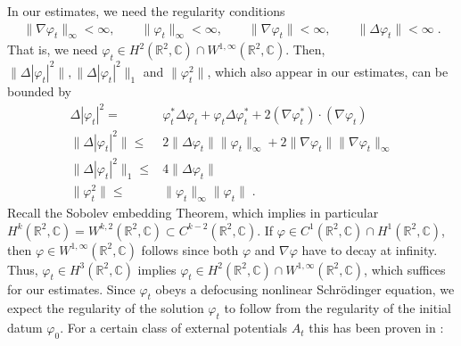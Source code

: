 \documentclass[11pt, english, american]{article}
\renewcommand{\phi}{\varphi}
\begin{document}
In our estimates, we need the regularity conditions 
\begin{align*}
\| \nabla \phi_t \|_\infty < \infty,
\qquad
\|  \phi_t \|_\infty < \infty,
\qquad
\| \nabla \phi_t \| < \infty,
\qquad
\| \Delta\phi_t \| < \infty \;.
\end{align*}
That is, we need $\phi_t \in H^2(\mathbb{R}^2,\mathbb{C}) \cap W^{1,\infty}(\mathbb{R}^2,\mathbb{C})$.
Then, $ \| \Delta|\phi_t| ^2 \|, \| \Delta|\phi_t| ^2 \|_1$ and $ \| \phi_t^ 2 \| $, which also appear in our estimates, can be bounded by
\begin{align*}
 \Delta|\phi_t|^ 2
 =&
 \phi^*_t \Delta \phi_t
  +
 \phi_t  \Delta\phi^*_t
   +
  2   (\nabla \phi^*_t) \cdot (\nabla \phi_t)
  \\
 \| \Delta|\phi_t| ^2 \|
 \leq &
2
 \| \Delta \phi_t \| \| \phi_t \| _\infty
 +
 2
 \| \nabla \phi_t \|  \| \nabla \phi_t \| _\infty
   \\
 \| \Delta|\phi_t| ^2 \|_1 \leq&  4 \| \Delta \phi_t \|
 \\
 \| \phi_t^ 2 \| \leq &\| \phi_t \|_\infty \| \phi_t \|
 \;.
\end{align*}
Recall the Sobolev embedding Theorem, which implies in particular
$H^k(\mathbb{R}^2,\mathbb{C})= W^{k,2}(\mathbb{R}^ 2,\mathbb{C}) \subset C^{k-2}(\mathbb{R}^2,\mathbb{C})$. 
If $\phi \in C^1(\mathbb{R}^2,\mathbb{C}) \cap H^1(\mathbb{R}^2,\mathbb{C})$, then $\phi \in W^{1,\infty}(\mathbb{R}^2,\mathbb{C})$ follows since both $\phi$ and $\nabla \phi$ have to decay at infinity.
 Thus, $\phi_t \in H^3(\mathbb{R}^2,\mathbb{C})$ implies $\phi_t \in H^2(\mathbb{R}^2,\mathbb{C}) \cap W^{1,\infty}(\mathbb{R}^2, \mathbb{C})$, which suffices for our estimates. Since $\phi_t$ obeys a defocusing nonlinear Schr\"odinger equation, we expect the regularity of the solution $\phi_t$ to follow from the regularity of the initial datum $\phi_0$. For a certain class of external potentials $A_t$ this has been proven in \cite{carles}:
\end{document}
